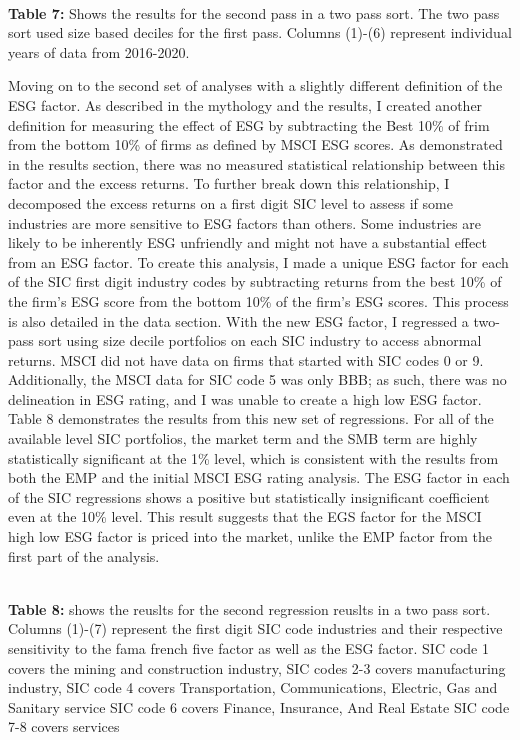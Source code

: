 \begin{center}
    \paperspacingnarrow
    \\
    \textbf{Table 7:} Shows the results for the second pass in a two pass sort. The two pass sort used size based deciles for the first pass. Columns (1)-(6) represent individual years of data from 2016-2020. 
    
    \paperspacingwide
\end{center}

 
 Moving on to the second set of analyses with a slightly different definition of the ESG factor.  As described in the mythology and the results, I created another definition for measuring the effect of ESG by subtracting the Best 10\% of frim from the bottom 10\% of firms as defined by MSCI ESG scores. As demonstrated in the results section, there was no measured statistical relationship between this factor and the excess returns. To further break down this relationship, I decomposed the excess returns on a first digit SIC level to assess if some industries are more sensitive to ESG factors than others. Some industries are likely to be inherently ESG unfriendly and might not have a substantial effect from an ESG factor. To create this analysis, I made a unique ESG factor for each of the SIC first digit industry codes by subtracting returns from the best 10\% of the firm's ESG score from the bottom 10\% of the firm's ESG scores. This process is also detailed in the data section. With the new ESG factor, I regressed a two-pass sort using size decile portfolios on each SIC industry to access abnormal returns. MSCI did not have data on firms that started with SIC codes 0 or  9. Additionally, the MSCI data for SIC code 5 was only BBB; as such, there was no delineation in ESG rating, and I was unable to create a high low ESG factor. Table 8 demonstrates the results from this new set of regressions. For all of the available level SIC portfolios, the market term and the SMB term are highly statistically significant at the 1\% level, which is consistent with the results from both the EMP and the initial MSCI ESG rating analysis. The ESG factor in each of the SIC regressions shows a positive but statistically insignificant coefficient even at the 10\% level. This result suggests that the EGS factor for the MSCI high low ESG factor is priced into the market, unlike the EMP factor from the first part of the analysis. 
\begin{center}
    \paperspacingnarrow
    \\
    \textbf{Table 8:} shows the reuslts for the second regression reuslts in a two pass sort. Columns (1)-(7) represent the first digit SIC code industries and their respective sensitivity to the fama french five factor as well as the ESG factor. SIC code 1 covers the mining and construction industry, SIC codes 2-3 covers manufacturing industry, SIC code 4 covers Transportation, Communications, Electric, Gas and Sanitary service SIC code 6 covers Finance, Insurance, And Real Estate SIC code 7-8 covers services\\
    
    \paperspacingwide
\end{center}
 
